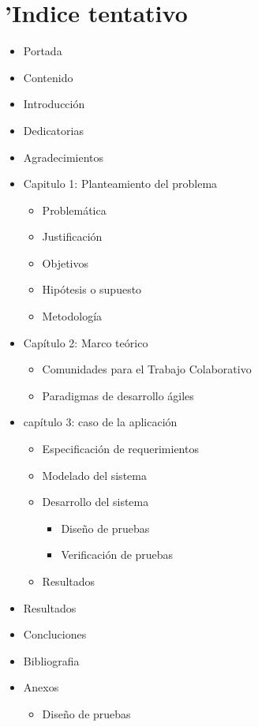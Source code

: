 \chapter{'Indice tentativo}

\begin{itemize}
    \item Portada
    \item Contenido
    \item Introducci\'on
    \item Dedicatorias
    \item Agradecimientos
    \item Capitulo 1: Planteamiento del problema
        \begin{itemize}
            \item Problem\'atica
            \item Justificaci\'on
            \item Objetivos
            \item Hip\'otesis o supuesto
            \item Metodolog\'ia
        \end{itemize}
    \item Cap\'itulo 2: Marco te\'orico
        \begin{itemize}
            \item Comunidades para el Trabajo Colaborativo
            \item Paradigmas de desarrollo \'agiles
        \end{itemize}
    \item cap\'itulo 3: caso de la aplicaci\'on
        \begin{itemize}
            \item Especificaci\'on de requerimientos
            \item Modelado del sistema
            \item Desarrollo del sistema
                \begin{itemize}
                    \item Dise\~no de pruebas
                    \item Verificaci\'on de pruebas
                \end{itemize}
            \item Resultados
        \end{itemize}
    \item Resultados
    \item Concluciones
    \item Bibliografia
    \item Anexos
        \begin{itemize}
            \item Dise\~no de pruebas
        \end{itemize}
     \end{itemize}

